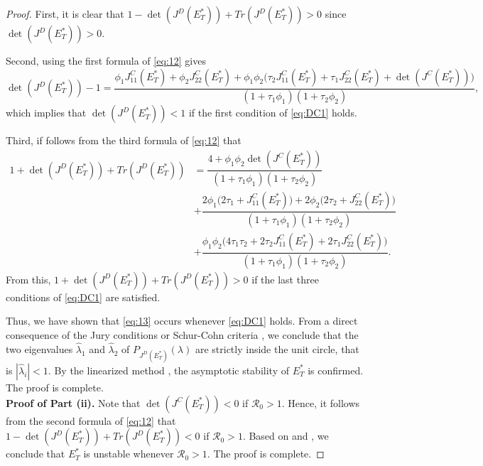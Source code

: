 \documentclass[12pt]{article}
\theoremstyle{definition}
\theoremstyle{remark}
\numberwithin{equation}{section}
\begin{document}
\begin{proof}
First, it is clear that $1 - \det(J^D(E_T^*)) + Tr(J^D(E_T^*))  > 0$ since $\det(J^D(E_T^*)) > 0$.

Second, using the first formula of \eqref{eq:12} gives
\begin{equation*}
\det(J^D(E_T^*)) - 1 = \dfrac{\phi_1J_{11}^C(E_T^*) + \phi_2J_{22}^C(E_T^*) + \phi_1\phi_2\big(\tau_2J_{11}^C(E_T^*) + \tau_1J_{22}^C(E_T^*) + \det(J^C(E_T^*))\big)}{(1 + \tau_1\phi_1)(1 + \tau_2\phi_2)},
\end{equation*}
which implies that $\det(J^D(E_T^*)) < 1$ if the first condition of \eqref{eq:DC1} holds.

Third, if follows from the third formula of \eqref{eq:12} that
\begin{equation*}
\begin{split}
1 + \det(J^D(E_T^*)) + Tr(J^D(E_T^*)) &= \dfrac{4 + \phi_1\phi_2\det(J^C(E_T^*))}{(1 + \tau_1\phi_1)(1 + \tau_2\phi_2)}\\
&+ \dfrac{2\phi_1\big(2\tau_1 + J_{11}^C(E_T^*)\big) + 2\phi_2\big(2\tau_2 + J_{22}^C(E_T^*)\big)}{(1 + \tau_1\phi_1)(1 + \tau_2\phi_2)}\\
&+ \dfrac{\phi_1\phi_2\big(4\tau_1\tau_2 + 2\tau_2J_{11}^C(E_T^*) + 2\tau_1J_{22}^C(E_T^*)\big)}{(1 + \tau_1\phi_1)(1 + \tau_2\phi_2)}.
\end{split}
\end{equation*}
From this, $1 + \det(J^D(E_T^*)) + Tr(J^D(E_T^*)) > 0$ if the last three conditions of \eqref{eq:DC1} are satisfied.

Thus, we have shown that \eqref{eq:13} occurs whenever \eqref{eq:DC1} holds. From a direct consequence of the Jury conditions or Schur-Cohn criteria \cite[Theorem 2.13]{Allen}, we conclude that the two eigenvalues $\widehat{\lambda}_1$ and $\widehat{\lambda}_2$ of $P_{J^D(E_T^*)}(\lambda)$ are strictly inside the unit circle, that is $|\widehat{\lambda}_i| < 1$. By the linearized method \cite[Theorem 1.3.7]{Stuart}, the asymptotic stability of $E_T^*$ is confirmed. The proof is complete.\\
%
%
%
\textbf{Proof of Part (ii).} Note that $\det(J^C(E_T^*)) < 0$ if $\mathcal{R}_0 > 1$. Hence, it follows from the second formula of \eqref{eq:12} that $1 - \det(J^D(E_T^*)) + Tr(J^D(E_T^*)) < 0$ if $\mathcal{R}_0 > 1$. Based on \cite[Theorem 2.13]{Allen} and \cite[Theorem 1. 3. 7]{Stuart}, we conclude that $E_T^*$ is unstable whenever $\mathcal{R}_0 > 1$. The proof is complete.
\end{proof}
\end{document}
